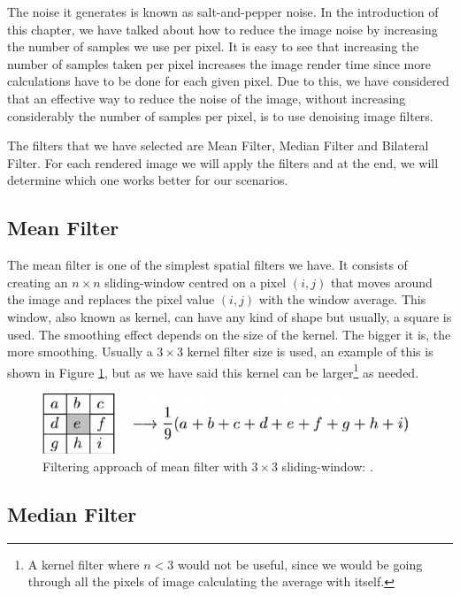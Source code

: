 \documentclass[titlepage,12pt]{report}
\begin{document}
 The noise it generates is known as salt-and-pepper noise. In the introduction of this chapter, we have talked about how to reduce the image noise by increasing the number of samples we use per pixel. It is easy to see that increasing the number of samples taken per pixel increases the image render time since more calculations have to be done for each given pixel. Due to this, we have considered that an effective way to reduce the noise of the image, without increasing considerably the number of samples per pixel, is to use denoising image filters.

The filters that we have selected are Mean Filter, Median Filter and Bilateral Filter. For each rendered image we will apply the filters and at the end, we will determine which one works better for our scenarios.

\subsection{Mean Filter}

The mean filter is one of the simplest spatial filters we have. It consists of creating an $n \times n$ sliding-window centred on a pixel $(i,j)$ that moves around the image and replaces the pixel value $(i,j)$ with the window average. This window, also known as kernel, can have any kind of shape but usually, a square is used. The smoothing effect depends on the size of the kernel. The bigger it is, the more smoothing. Usually a $3 \times 3$ kernel filter size is used, an example of this is shown in Figure \ref{mean_filter}, but as we have said this kernel can be larger\footnote{A kernel filter where $n < 3$ would not be useful, since we would be going through all the pixels of image calculating the average with itself.} as needed.

\begin{figure}[H]
	\centering
	\includegraphics[scale=0.45]{media/mean_filter.jpg}
	\caption{Filtering approach of mean filter with $3 \times 3$ sliding-window: \citep{Lyra2011}.}
	\label{mean_filter}
\end{figure}


\subsection{Median Filter}
\end{document}
